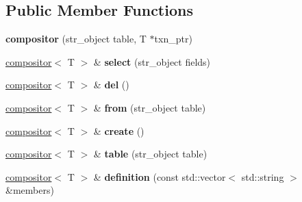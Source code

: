 \subsection*{Public Member Functions}
\begin{DoxyCompactItemize}
\item 
\mbox{\label{structmods_1_1sql_1_1compositor_a9e9428f1ef661002548da0bd27134a71}} 
{\bfseries compositor} (str\+\_\+object table, T $\ast$txn\+\_\+ptr)
\item 
\mbox{\label{structmods_1_1sql_1_1compositor_aa7c84ee480e5f5859df3c924bc4c0abd}} 
\hyperlink{structmods_1_1sql_1_1compositor}{compositor}$<$ T $>$ \& {\bfseries select} (str\+\_\+object fields)
\item 
\mbox{\label{structmods_1_1sql_1_1compositor_a70249250df08ec10707e7542f0f46472}} 
\hyperlink{structmods_1_1sql_1_1compositor}{compositor}$<$ T $>$ \& {\bfseries del} ()
\item 
\mbox{\label{structmods_1_1sql_1_1compositor_abc05eb2e74d9f3b529e3d6279448b306}} 
\hyperlink{structmods_1_1sql_1_1compositor}{compositor}$<$ T $>$ \& {\bfseries from} (str\+\_\+object table)
\item 
\mbox{\label{structmods_1_1sql_1_1compositor_a864ce061dd6b4544f5952ee7aa58f076}} 
\hyperlink{structmods_1_1sql_1_1compositor}{compositor}$<$ T $>$ \& {\bfseries create} ()
\item 
\mbox{\label{structmods_1_1sql_1_1compositor_a363a32e1aa3dd0d9759e398e280b8673}} 
\hyperlink{structmods_1_1sql_1_1compositor}{compositor}$<$ T $>$ \& {\bfseries table} (str\+\_\+object table)
\item 
\mbox{\label{structmods_1_1sql_1_1compositor_ab84992127bb89e382103b1524b0917fc}} 
\hyperlink{structmods_1_1sql_1_1compositor}{compositor}$<$ T $>$ \& {\bfseries definition} (const std\+::vector$<$ std\+::string $>$ \&members)
\item 
\mbox{\label{structmods_1_1sql_1_1compositor_a5ec340f3c53174658ee550b29ae6972f}} 

\end{DoxyCompactItemize}
